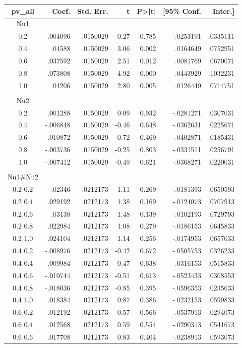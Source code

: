 \begin{tabular}{c|rrrrrr}
\hline
 pv\_all&Coef.&Std. Err.&t&P>|t|&[95\% Conf. & Inter.]\\
\hline
 Nu1&&&&&& \\
 0.2&.004096&.0150029&0.27&0.785&-.0253191&.0335111\\
 0.4&.04588&.0150029&3.06&0.002&.0164649&.0752951\\
 0.6&.037592&.0150029&2.51&0.012&.0081769&.0670071\\
 0.8&.073808&.0150029&4.92&0.000&.0443929&.1032231\\
 1.0&.04206&.0150029&2.80&0.005&.0126449&.0714751\\
 \\
 Nu2&&&&&& \\
 0.2&.001288&.0150029&0.09&0.932&-.0281271&.0307031\\
 0.4&-.006848&.0150029&-0.46&0.648&-.0362631&.0225671\\
 0.6&-.010872&.0150029&-0.72&0.469&-.0402871&.0185431\\
 0.8&-.003736&.0150029&-0.25&0.803&-.0331511&.0256791\\
 1.0&-.007412&.0150029&-0.49&0.621&-.0368271&.0220031\\
 \\
 Nu1\#Nu2&&&&&& \\
 0.2 0.2&.02346&.0212173&1.11&0.269&-.0181393&.0650593\\
 0.2 0.4&.029192&.0212173&1.38&0.169&-.0124073&.0707913\\
 0.2 0.6&.03138&.0212173&1.48&0.139&-.0102193&.0729793\\
 0.2 0.8&.022984&.0212173&1.08&0.279&-.0186153&.0645833\\
 0.2 1.0&.024104&.0212173&1.14&0.256&-.0174953&.0657033\\
 0.4 0.2&-.008976&.0212173&-0.42&0.672&-.0505753&.0326233\\
 0.4 0.4&.009984&.0212173&0.47&0.638&-.0316153&.0515833\\
 0.4 0.6&-.010744&.0212173&-0.51&0.613&-.0523433&.0308553\\
 0.4 0.8&-.018036&.0212173&-0.85&0.395&-.0596353&.0235633\\
 0.4 1.0&.018384&.0212173&0.87&0.386&-.0232153&.0599833\\
 0.6 0.2&-.012192&.0212173&-0.57&0.566&-.0537913&.0294073\\
 0.6 0.4&.012568&.0212173&0.59&0.554&-.0290313&.0541673\\
 0.6 0.6&.017708&.0212173&0.83&0.404&-.0238913&.0593073\\

\end{tabular}
